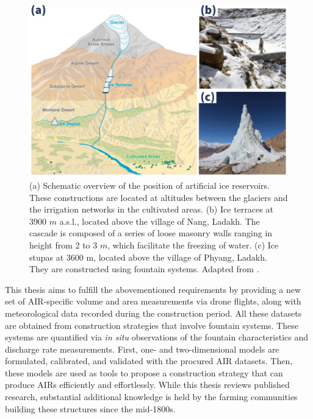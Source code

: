 \begin{figure}[t]
	\centering
	\includegraphics[width=\textwidth]{figs/AIR_forms.jpg}

	\caption{ (a) Schematic overview of the position of artificial ice reservoirs. These constructions are located at
		altitudes between the glaciers and the irrigation networks in the cultivated areas. (b) Ice terraces at 3900
		$m$ \ac{a.s.l.}, located above the village of Nang, Ladakh. The cascade is composed of a series of loose masonry walls
		ranging in height from 2 to 3 $m$, which facilitate the freezing of water. (c) Ice stupas at 3600 m, located
		above the village of Phyang, Ladakh. They are constructed using fountain systems. Adapted from \citet{nusserLocalKnowledgeGlobal2016}. }

	\label{fig:AIRforms}
\end{figure}

This thesis aims to fulfill the abovementioned requirements by providing a new set of \ac{AIR}-specific volume and area
measurements via drone flights, along with meteorological data recorded during the construction period. All these
datasets are obtained from construction strategies that involve fountain systems. These systems are quantified
via \textit{in situ} observations of the fountain characteristics and discharge rate measurements. First, one- and two-dimensional models are formulated, calibrated, and validated with the procured \ac{AIR} datasets. Then,
these models are used as tools to propose a construction strategy that can produce \ac{AIRs} efficiently and
effortlessly. While this thesis reviews published research, substantial additional knowledge is held by the
farming communities building these structures since the mid-1800s.


